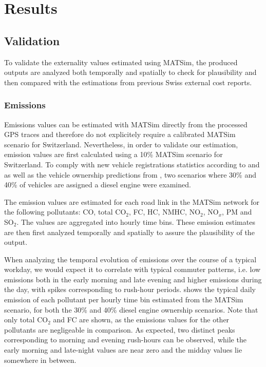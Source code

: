 \section{Results}
\subsection{Validation}
To validate the externality values estimated using MATSim, the produced outputs are analyzed both temporally and spatially to check for plausibility and then compared with the estimations from previous Swiss external cost reports.

\subsubsection{Emissions}
Emissions values can be estimated with MATSim directly from the processed GPS traces and therefore do not explicitely require a calibrated MATSim scenario for Switzerland.
Nevertheless, in order to validate our estimation, emission values are first calculated using a 10\% MATSim scenario for Switzerland.
To comply with new vehicle registrations statistics according to \cite{autoschweiz2010} and \cite{autoschweiz2012} as well as the vehicle ownership predictions from \cite{foen2010pollutants}, two scenarios where 30\% and 40\% of vehicles are assigned a diesel engine were examined.

The emission values are estimated for each road link in the MATSim network for the following pollutants: CO, total CO$_2$, FC, HC, NMHC, NO$_2$, NO$_x$, PM and SO$_2$.
The values are aggregated into hourly time bins.
These emission estimates are then first analyzed temporally and spatially to assure the plausibility of the output.

When analyzing the temporal evolution of emissions over the course of a typical workday, we would expect it to correlate with typical commuter patterns, i.e. low emissions both in the early morning and late evening and higher emissions during the day, with spikes corresponding to rush-hour periods.
 shows the typical daily emission of each pollutant per hourly time bin estimated from the MATSim scenario, for both the 30\% and 40\% diesel engine ownership scenarios.
Note that only total CO$_2$ and FC are shown, as the emissions values for the other pollutants are negligeable in comparison.
As expected, two distinct peaks corresponding to morning and evening rush-hours can be observed, while the early morning and late-night values are near zero and the midday values lie somewhere in between.


